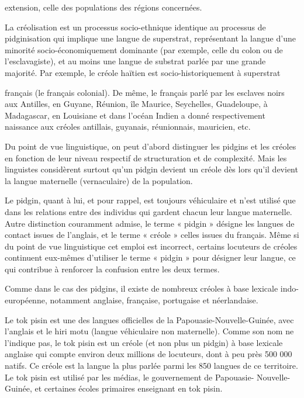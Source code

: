 extension, celle des populations des régions concernées.


La créolisation est un processus socio-ethnique identique au processus de pidginisation qui implique une langue de superstrat, représentant la langue d’une minorité socio-économiquement dominante (par exemple, celle du colon ou de l’esclavagiste), et au moins une langue de substrat parlée par une grande majorité. Par exemple, le créole haïtien est socio-historiquement à superstrat


français (le français colonial). De même, le français parlé par les esclaves noirs aux Antilles, en Guyane, Réunion, île Maurice, Seychelles, Guadeloupe, à Madagascar, en Louisiane et dans l’océan Indien a donné respectivement naissance aux créoles antillais, guyanais, réunionnais, mauricien, etc.




Du point de vue linguistique, on peut d’abord distinguer les pidgins et les créoles en fonction de leur niveau respectif de structuration et de complexité. Mais les linguistes considèrent surtout qu’un pidgin devient un créole dès lors qu’il devient la langue maternelle (vernaculaire) de la population.


Le pidgin, quant à lui, et pour rappel, est toujours véhiculaire et n’est utilisé que dans les relations entre des individus qui gardent chacun leur langue maternelle. Autre distinction couramment admise, le terme « pidgin » désigne les langues de contact issues de l’anglais, et le terme « créole » celles issues du français. Même si du point de vue linguistique cet emploi est incorrect, certains locuteurs de créoles continuent eux-mêmes d’utiliser le terme « pidgin » pour désigner leur langue, ce qui contribue à renforcer la confusion entre les deux termes.


 Comme dans le cas des pidgins, il existe de nombreux créoles à base lexicale indo-européenne, notamment anglaise, française, portugaise et néerlandaise.



Le tok pisin est une des langues officielles de la Papouasie-Nouvelle-Guinée, avec l’anglais et le hiri motu (langue véhiculaire non maternelle). Comme son nom ne l’indique pas, le tok pisin est un créole (et non plus un pidgin) à base lexicale anglaise qui compte environ deux millions de locuteurs, dont à peu près 500 000 natifs. Ce créole est la langue la plus parlée parmi les 850 langues de ce territoire. Le tok pisin est utilisé par les médias, le gouvernement de Papouasie- Nouvelle-Guinée, et certaines écoles primaires enseignant en tok pisin.


